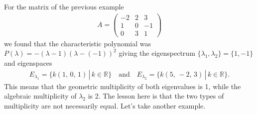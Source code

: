 \noindent For the matrix of the previous example
\begin{align*}
A
=
\begin{pmatrix}
 -2 &  2 &  3 \\
  1 &  0 & -1 \\
  0 &  3 &  1
\end{pmatrix}
\end{align*}
we found that the characteristic polynomial was $P(\lambda) = -(\lambda - 1)(\lambda - (-1))^2$ giving the eigenspectrum $\{\lambda_1, \lambda_2\}=\{1, -1\}$ and eigenspaces
\begin{align*}
E_{\lambda_1} = \{ k(1,\,0,\,1) \, | \, k \in \mathbb{R} \} \quad \text{and} \quad E_{\lambda_2} = \{ k(5,\,-2,\,3) \, | \, k \in \mathbb{R} \}.
\end{align*}
This means that the geometric multiplicity of both eigenvalues is 1, while the algebraic multiplicity of $\lambda_2$ is 2. The lesson here is that the two types of multiplicity are not necessarily equal. Let's take another example.

